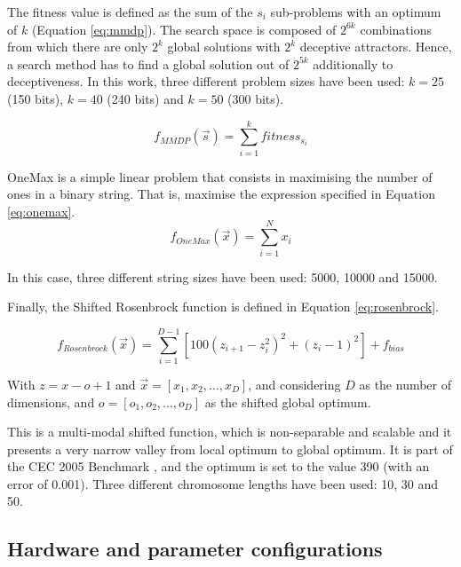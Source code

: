 \documentclass[final,1p,times]{elsarticle}
\begin{document}
The fitness value is defined as the sum of the $s_i$ sub-problems with an optimum of $k$ (Equation \ref{eq:mmdp}).
The search space is composed of $2^{6k}$ combinations from which there
are only $2^k$ global solutions with $2^k$ deceptive
attractors. Hence, a search method has to find a global solution
out of $2^{5k}$ additionally to deceptiveness. In this work, three different problem sizes have been used: $k=25$ (150 bits), $k=40$ (240 bits) and $k=50$ (300 bits). 

\begin{equation}\label{eq:mmdp}
f_{MMDP}(\vec s)= \sum_{i=1}^{k} fitness_{s_i}
\end{equation}


OneMax is a simple linear problem that consists in maximising the number of ones in a binary string. That is, maximise the expression specified in Equation \ref{eq:onemax}.
\begin{equation}\label{eq:onemax}
f_{OneMax}(\vec{x}) = \sum_{i=1}^{N}{x_{i}}
\end{equation}

In this case, three different string sizes have been used: 5000, 10000 and 15000.

Finally, the Shifted Rosenbrock function is defined in Equation \ref{eq:rosenbrock}.


\begin{equation}\label{eq:rosenbrock}
f_{Rosenbrock}(\vec{x}) = \sum^{D-1}_{i = 1} [100(z_{i + 1} - z^2_i)^2 + (z_i - 1)^2] + f_{bias}
\end{equation}

With $z=x-o+1$ and $\vec{x}=[x_1,x_2,...,x_D]$, and considering $D$ as the number of dimensions, and $o=[o_1,o_2,...,o_D]$ as the shifted global optimum.

This is a multi-modal shifted function, which is non-separable and scalable and it presents a very narrow valley from local optimum to global optimum. It is part of the CEC 2005 Benchmark \cite{CEC2005_Benchmark}, and the optimum is set to the value 390 (with an error of 0.001). Three different chromosome lengths have been used: 10, 30 and 50.



\subsection{Hardware and parameter configurations}
\end{document}
